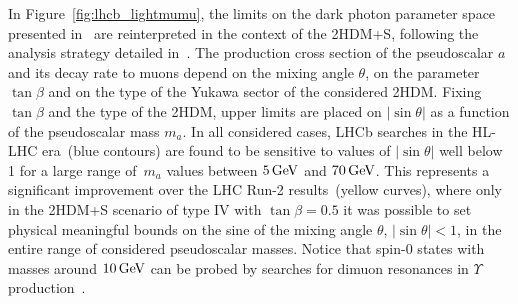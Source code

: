 In Figure~\ref{fig:lhcb_lightmumu}, the limits on the dark photon parameter space presented in~\cite{Bediaga:2018lhg} are reinterpreted in the context of the 2HDM+S, following the analysis strategy detailed in~\cite{Haisch:2018kqx}. The production cross section of the pseudoscalar $a$ and its decay rate to muons depend on the mixing angle $\theta$, on the parameter $\tan\beta$ and on the type of the Yukawa sector of the considered 2HDM. Fixing $\tan\beta$ and the type of the 2HDM, upper limits are placed on $|\!\sin\theta|$ as a function of the pseudoscalar mass $m_a$. In all considered cases, LHCb searches in the HL-LHC era~(blue contours) are found to be sensitive to values of $|\!\sin\theta|$ well below 1 for a large range of~$m_a$ values between $5 \, {\rm GeV}$ and $70 \, {\rm GeV}$. This represents a significant improvement over the LHC Run-2 results~(yellow curves), where only in the 2HDM+S scenario of type IV with $\tan \beta = 0.5$ it was possible to set physical meaningful bounds on the sine of the mixing angle $\theta$, \ie $|\!\sin\theta| < 1$, in the entire range of considered pseudoscalar masses. Notice that spin-0 states with masses around $10 \, {\rm GeV}$ can be probed by searches for dimuon resonances in $\Upsilon$ production~\cite{Haisch:2016hzu,Aaij:2018xpt}.
